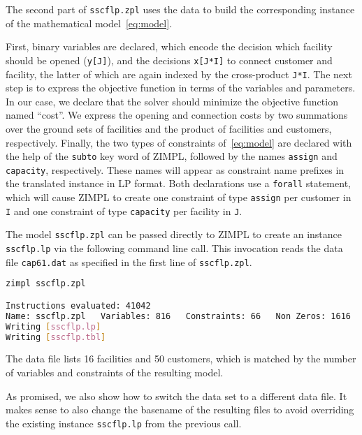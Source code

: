 \documentclass[a4paper,10pt]{article}
\begin{document}
The second part of \texttt{sscflp.zpl} uses the data to build the corresponding instance of the mathematical model~\eqref{eq:model}.
%


%
First, binary variables are declared, which encode the decision which facility should be opened (\texttt{y[J]}),
and the decisions \texttt{x[J*I]} to connect customer and facility, the latter of which are again indexed by the cross-product \texttt{J*I}.
%
The next step is to express the objective function in terms of the variables and parameters.
%
In our case, we declare that the solver should minimize the objective function named ``cost''. We express the opening and connection costs by two summations over the ground sets of facilities and the product of facilities and customers, respectively.
%
Finally, the two types of constraints of~\eqref{eq:model} are declared with the help of the \texttt{subto} key word of ZIMPL, followed by the names \texttt{assign} and \texttt{capacity}, respectively.
%
These names will appear as constraint name prefixes in the translated instance in LP format.
%
Both declarations use a \texttt{forall} statement, which will cause ZIMPL to create one constraint of type \texttt{assign} per customer in \texttt{I} and one constraint of type \texttt{capacity} per facility in \texttt{J}.

The model \texttt{sscflp.zpl} can be passed directly to ZIMPL to create an instance \texttt{sscflp.lp} via the following command line call.
This invocation reads the data file \texttt{cap61.dat} as specified in
the first line of \texttt{sscflp.zpl}.

\begin{lstlisting}[language=bash,caption=ZIMPL command line invokation]
zimpl sscflp.zpl

Instructions evaluated: 41042
Name: sscflp.zpl   Variables: 816   Constraints: 66   Non Zeros: 1616
Writing [sscflp.lp]
Writing [sscflp.tbl]
\end{lstlisting}

The data file lists 16 facilities and 50 customers, which is matched by the number of variables and constraints of the resulting model.
%

As promised, we also show how to switch the data set to a different data file.
%
It makes sense to also change the basename of the resulting files to avoid overriding the existing instance \texttt{sscflp.lp} from the previous call.
\end{document}
